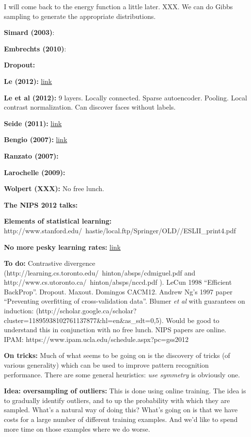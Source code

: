 \documentclass[12pt]{article}
\newcommand{\link}[2]{\href{#1}{#2}}
\begin{document}
I will come back to the energy function a little later.  XXX.  We can
do Gibbs sampling to generate the appropriate distributions.




\textbf{Simard (2003)}:

\textbf{Embrechts (2010)}:

\textbf{Dropout:}

\textbf{Le (2012):} \link{https://plus.google.com/u/0/+ResearchatGoogle/posts/EMyhnBetd2F}{link}

\textbf{Le et al (2012):} 9 layers.  Locally connected.  Sparse
autoencoder.  Pooling.  Local contrast normalization.  Can discover
faces without labels.

\textbf{Seide (2011):}
\link{http://research.microsoft.com/apps/pubs/default.aspx?id=153169}{link}

\textbf{Bengio (2007):} \link{http://arxiv.org/pdf/1206.5533v2.pdf}{link}

\textbf{Ranzato (2007):}

\textbf{Larochelle (2009):}

\textbf{Wolpert (XXX):} No free lunch.

\textbf{The NIPS 2012 talks:}

\textbf{Elements of statistical learning:} http://www.stanford.edu/~hastie/local.ftp/Springer/OLD//ESLII_print4.pdf

\textbf{No more pesky learning rates:} \link{http://arxiv.org/pdf/1206.1106.pdf}{link}

\textbf{To do:} Contrastive divergence
(http://learning.cs.toronto.edu/~hinton/absps/cdmiguel.pdf and
http://www.cs.utoronto.ca/~hinton/absps/nccd.pdf ). LeCun 1998
``Efficient BackProp''.  Dropout.  Maxout. Domingos CACM12.  Andrew
Ng's 1997 paper ``Preventing overfitting of cross-validation data''.
Blumer \emph{et al} with guarantees on induction:
(http://scholar.google.ca/scholar?cluster=11895938102761137877\&hl=en\&as\_sdt=0,5).
Would be good to understand this in conjunction with no free lunch.
NIPS papers are online.  IPAM: https://www.ipam.ucla.edu/schedule.aspx?pc=gss2012

\textbf{On tricks:} Much of what seems to be going on is the discovery
of tricks (of various generality) which can be used to improve pattern
recognition performance.  There are some general heuristics: \emph{use
  symmetry} is obviously one.

\textbf{Idea: oversampling of outliers:} This is done using online
training.  The idea is to gradually identify outliers, and to up the
probability with which they are sampled.  What's a natural way of
doing this?  What's going on is that we have costs for a large number
of different training examples.  And we'd like to spend more time on
those examples where we do worse.  
\end{document}
